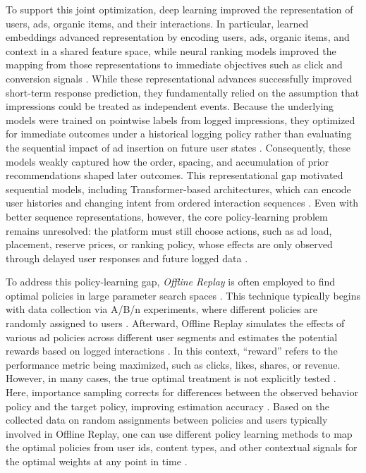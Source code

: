 \documentclass[manuscript,review,screen]{acmart}
\begin{document}
To support this joint optimization, deep learning improved the representation of users, ads, organic items, and their interactions. In particular, learned embeddings advanced representation by encoding users, ads, organic items, and context in a shared feature space, while neural ranking models improved the mapping from those representations to immediate objectives such as click and conversion signals \cite{covington2016deep, cheng2016wide, vorotilov2023scaling}. While these representational advances successfully improved short-term response prediction, they fundamentally relied on the assumption that impressions could be treated as independent events. Because the underlying models were trained on pointwise labels from logged impressions, they optimized for immediate outcomes under a historical logging policy rather than evaluating the sequential impact of ad insertion on future user states \cite{swaminathan2015counterfactual, chen2022off}. Consequently, these models weakly captured how the order, spacing, and accumulation of prior recommendations shaped later outcomes. This representational gap motivated sequential models, including Transformer-based architectures, which can encode user histories and changing intent from ordered interaction sequences \cite{vaswani2017attention, kang2018sasrec, Zhou2019}. Even with better sequence representations, however, the core policy-learning problem remains unresolved: the platform must still choose actions, such as ad load, placement, reserve prices, or ranking policy, whose effects are only observed through delayed user responses and future logged data \cite{sagtani2024ad, zou2019reinforcement}.

To address this policy-learning gap, \textit{Offline Replay} is often employed to find optimal policies in large parameter search spaces \cite{agarwal2016statistical, levine2020offline, agarwal2020optimistic}. This technique typically begins with data collection via A/B/n experiments, where different policies are randomly assigned to users \cite{agarwal2019online, chen2009large}. Afterward, Offline Replay simulates the effects of various ad policies across different user segments and estimates the potential rewards based on logged interactions \cite{agarwal2016statistical}. In this context, ``reward'' refers to the performance metric being maximized, such as clicks, likes, shares, or revenue. However, in many cases, the true optimal treatment is not explicitly tested \cite{agarwal2019online}. Here, importance sampling corrects for differences between the observed behavior policy and the target policy, improving estimation accuracy \cite{Sutton1998, dudik2011doubly}. Based on the collected data on random assignments between policies and users typically involved in Offline Replay, one can use different policy learning methods to map the optimal policies from user ids, content types, and other contextual signals for the optimal weights at any point in time \cite{swaminathan2015counterfactual}. 
\end{document}
